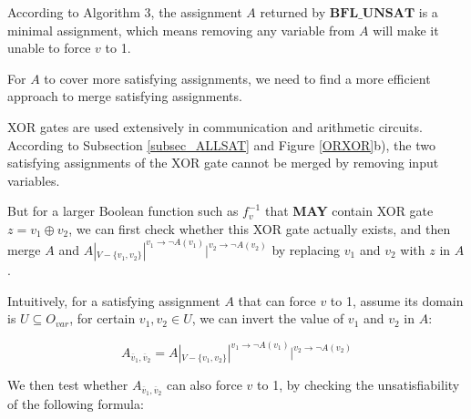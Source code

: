 \documentclass[journal]{IEEEtran}
\begin{document}


According to Algorithm 3,
the assignment $A$ returned by $\boldsymbol{BFL\_UNSAT}$ is a minimal assignment,
which means
removing any variable from $A$ will make it unable to force $v$ to 1.

For $A$ to cover more satisfying assignments,
we need to find a more efficient approach to merge satisfying assignments.

XOR gates are used extensively in communication and arithmetic circuits.
According to Subsection \ref{subsec_ALLSAT} and Figure \ref{ORXOR}b),
the two satisfying assignments of the XOR gate cannot be merged by removing input variables.

But for a larger Boolean function such as $f^{-1}_v$ that \textbf{MAY} contain XOR gate $z=v_1 \oplus v_2$,
we can first check whether this XOR gate actually exists,
and then merge $A$ and $A|_{V-\{v_1,v_2\}}|^{v_1\to \neg A(v_1)}|^{v_2\to \neg A(v_2)}$ by replacing $v_1$ and $v_2$ with $z$ in $A$.

Intuitively,
for a satisfying assignment $A$ that can force $v$ to 1,
assume its domain is $U\subseteq O_{var}$,
for certain $v_1,v_2\in U$,
we can invert the value of $v_1$ and $v_2$ in $A$:

\begin{equation}
A_{\overline{v}_1,\overline{v}_2}=A|_{V-\{v_1,v_2\}}|^{v_1\to \neg A(v_1)}|^{v_2\to \neg A(v_2)}
\end{equation}

We then test whether $A_{\overline{v}_1,\overline{v}_2}$ can also force $v$ to 1,
by checking the unsatisfiability of the following formula:
\end{document}
